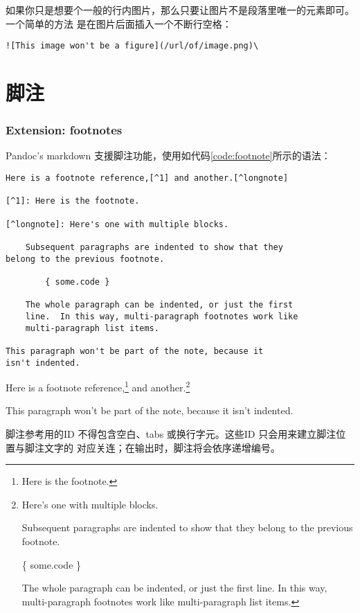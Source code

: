 \documentclass[fancyhdr,bookmark]{ctexbook}
\begin{document}
如果你只是想要个一般的行内图片，那么只要让图片不是段落里唯一的元素即可。一个简单的方法
是在图片后面插入一个不断行空格：

\begin{lstlisting}
![This image won't be a figure](/url/of/image.png)\
\end{lstlisting}

\section{脚注}\label{ux811aux6ce8}

\subsubsection{Extension: footnotes}\label{extension-footnotes}

Pandoc's markdown
支援脚注功能，使用如代码\ref{code:footnote}所示的语法：

\begin{lstlisting}[caption=脚注语法, label=code:footnote, float=htbp]
Here is a footnote reference,[^1] and another.[^longnote]

[^1]: Here is the footnote.

[^longnote]: Here's one with multiple blocks.

    Subsequent paragraphs are indented to show that they
belong to the previous footnote.

        { some.code }

    The whole paragraph can be indented, or just the first
    line.  In this way, multi-paragraph footnotes work like
    multi-paragraph list items.

This paragraph won't be part of the note, because it
isn't indented.
\end{lstlisting}

Here is a footnote reference,\footnote{Here is the footnote.} and
another.\footnote{Here's one with multiple blocks.

  Subsequent paragraphs are indented to show that they belong to the
  previous footnote.

  \{ some.code \}

  The whole paragraph can be indented, or just the first line. In this
  way, multi-paragraph footnotes work like multi-paragraph list items.}

This paragraph won't be part of the note, because it isn't indented.

脚注参考用的ID 不得包含空白、tabs 或换行字元。这些ID
只会用来建立脚注位置与脚注文字的
对应关连；在输出时，脚注将会依序递增编号。
\end{document}
